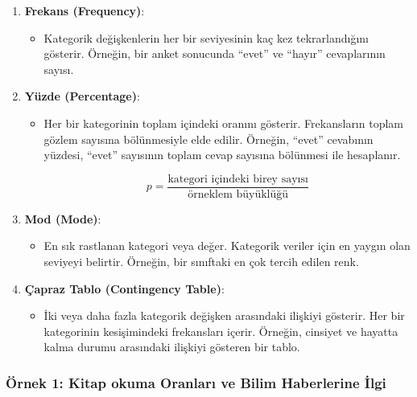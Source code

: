 \documentclass[
  letterpaper,
  DIV=11,
  numbers=noendperiod]{scrartcl}
\providecommand{\tightlist}{%
  \setlength{\itemsep}{0pt}\setlength{\parskip}{0pt}}\usepackage{longtable,booktabs,array}
\begin{document}
\begin{enumerate}
\def\labelenumi{\arabic{enumi}.}
\item
  \textbf{Frekans (Frequency)}:

  \begin{itemize}
  \tightlist
  \item
    Kategorik değişkenlerin her bir seviyesinin kaç kez tekrarlandığını
    gösterir. Örneğin, bir anket sonucunda ``evet'' ve ``hayır''
    cevaplarının sayısı.
  \end{itemize}
\item
  \textbf{Yüzde (Percentage)}:

  \begin{itemize}
  \item
    Her bir kategorinin toplam içindeki oranını gösterir. Frekansların
    toplam gözlem sayısına bölünmesiyle elde edilir. Örneğin, ``evet''
    cevabının yüzdesi, ``evet'' sayısının toplam cevap sayısına
    bölünmesi ile hesaplanır.

    \[
    p = \frac{\text{kategori içindeki birey sayısı}}{\text{örneklem büyüklüğü}}
    \]
  \end{itemize}
\item
  \textbf{Mod (Mode)}:

  \begin{itemize}
  \tightlist
  \item
    En sık rastlanan kategori veya değer. Kategorik veriler için en
    yaygın olan seviyeyi belirtir. Örneğin, bir sınıftaki en çok tercih
    edilen renk.
  \end{itemize}
\item
  \textbf{Çapraz Tablo (Contingency Table)}:

  \begin{itemize}
  \tightlist
  \item
    İki veya daha fazla kategorik değişken arasındaki ilişkiyi gösterir.
    Her bir kategorinin kesişimindeki frekansları içerir. Örneğin,
    cinsiyet ve hayatta kalma durumu arasındaki ilişkiyi gösteren bir
    tablo.
  \end{itemize}
\end{enumerate}

\hypertarget{uxf6rnek-1-kitap-okuma-oranlarux131-ve-bilim-haberlerine-ilgi}{%
\subsubsection{Örnek 1: Kitap okuma Oranları ve Bilim Haberlerine
İlgi}\label{uxf6rnek-1-kitap-okuma-oranlarux131-ve-bilim-haberlerine-ilgi}}
\end{document}
